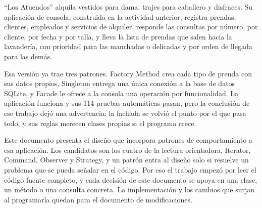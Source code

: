 %
%

``Los Atuendos'' alquila vestidos para dama, trajes para caballero y disfraces. Su aplicación de consola, construida en la actividad anterior, registra prendas, clientes, empleados y servicios de alquiler, responde las consultas por número, por cliente, por fecha y por talla, y lleva la lista de prendas que salen hacia la lavandería, con prioridad para las manchadas o delicadas y por orden de llegada para las demás.

Esa versión ya trae tres patrones. Factory Method crea cada tipo de prenda con sus datos propios, Singleton entrega una única conexión a la base de datos SQLite, y Facade le ofrece a la consola una operación por funcionalidad. La aplicación funciona y sus 114 pruebas automáticas pasan, pero la conclusión de ese trabajo dejó una advertencia: la fachada se volvió el punto por el que pasa todo, y sus reglas merecen clases propias si el programa crece.

Este documento presenta el diseño que incorpora patrones de comportamiento a esa aplicación. Los candidatos son los cuatro de la lectura orientadora, Iterator, Command, Observer y Strategy, y un patrón entra al diseño solo si resuelve un problema que se pueda señalar en el código. Por eso el trabajo empezó por leer el código fuente completo, y cada decisión de este documento se apoya en una clase, un método o una consulta concreta. La implementación y los cambios que surjan al programarla quedan para el documento de modificaciones.
